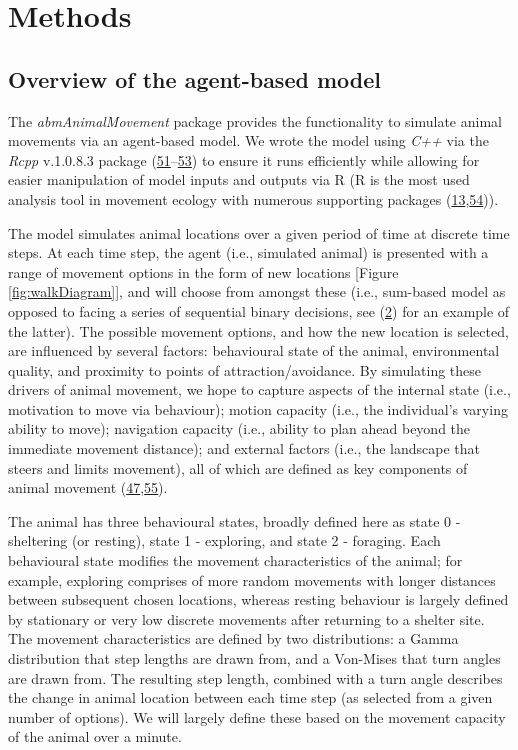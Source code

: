 \documentclass[10pt,a4paper]{article}
\begin{document}
\hypertarget{methods}{%
\section{Methods}\label{methods}}

\hypertarget{overview-of-the-agent-based-model}{%
\subsection{Overview of the agent-based model}\label{overview-of-the-agent-based-model}}

The \emph{abmAnimalMovement} package provides the functionality to simulate animal movements via an agent-based model.
We wrote the model using \emph{C++} via the \emph{Rcpp} v.1.0.8.3 package (\protect\hyperlink{ref-Eddelbuettel_seamless_2011}{51}--\protect\hyperlink{ref-Eddelbuettel_extending_2018}{53}) to ensure it runs efficiently while allowing for easier manipulation of model inputs and outputs via R (R is the most used analysis tool in movement ecology with numerous supporting packages (\protect\hyperlink{ref-joo_recent_2022}{13},\protect\hyperlink{ref-joo_navigating_2020}{54})).

The model simulates animal locations over a given period of time at discrete time steps.
At each time step, the agent (i.e., simulated animal) is presented with a range of movement options in the form of new locations {[}Figure \ref{fig:walkDiagram}{]}, and will choose from amongst these (i.e., sum-based model as opposed to facing a series of sequential binary decisions, see (\protect\hyperlink{ref-sridhar_geometry_2021}{2}) for an example of the latter).
The possible movement options, and how the new location is selected, are influenced by several factors: behavioural state of the animal, environmental quality, and proximity to points of attraction/avoidance.
By simulating these drivers of animal movement, we hope to capture aspects of the internal state (i.e., motivation to move via behaviour); motion capacity (i.e., the individual's varying ability to move); navigation capacity (i.e., ability to plan ahead beyond the immediate movement distance); and external factors (i.e., the landscape that steers and limits movement), all of which are defined as key components of animal movement (\protect\hyperlink{ref-Tang2010}{47},\protect\hyperlink{ref-Nathan2008}{55}).

The animal has three behavioural states, broadly defined here as state 0 - sheltering (or resting), state 1 - exploring, and state 2 - foraging.
Each behavioural state modifies the movement characteristics of the animal; for example, exploring comprises of more random movements with longer distances between subsequent chosen locations, whereas resting behaviour is largely defined by stationary or very low discrete movements after returning to a shelter site.
The movement characteristics are defined by two distributions: a Gamma distribution that step lengths are drawn from, and a Von-Mises that turn angles are drawn from.
The resulting step length, combined with a turn angle describes the change in animal location between each time step (as selected from a given number of options).
We will largely define these based on the movement capacity of the animal over a minute.
\end{document}
